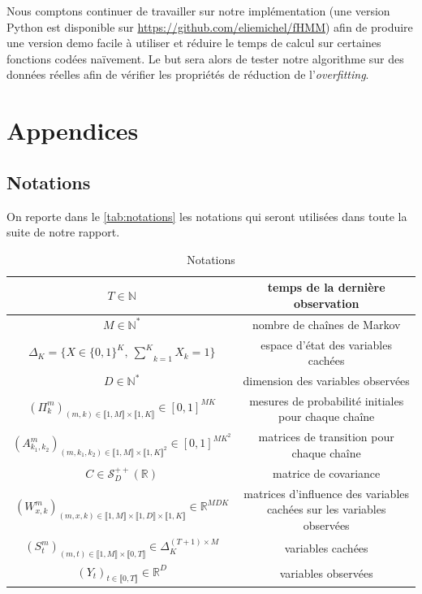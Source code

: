 \documentclass[10pt,a4paper]{article}
\begin{document}
Nous comptons continuer de travailler sur notre implémentation (une version Python est disponible sur \href{url}{https://github.com/eliemichel/fHMM}) afin de produire une version demo facile à utiliser et réduire le temps de calcul sur certaines fonctions codées naïvement. Le but sera alors de tester notre algorithme sur des données réelles afin de vérifier les propriétés de réduction de l'\textit{overfitting}.

\section{Appendices}
\subsection{Notations}
\label{Notations}
On reporte dans le \autoref{tab:notations} les notations qui seront utilisées
dans toute la suite de notre rapport.

\begin{table}[hpbt]

\begin{center}
  \begin{tabular}{|c|c|}
  \hline
  $T \in \mathbb{N}$ & temps de la dernière observation \\ \hline
  $M \in \mathbb{N}^*$ & nombre de chaînes de Markov \\ \hline
  $\Delta_K=\lbrace X \in \lbrace0,1\rbrace^K, \ 
  \underset{k=1}{\overset{K}{\sum}}X_k=1\rbrace$ & espace d'état des variables 
  cachées \\ \hline
  $D \in \mathbb{N}^*$ & dimension des variables observées \\ \hline
  $(\Pi_{k}^m)_{(m,k) \in \llbracket 1,M \rrbracket \times \llbracket 1,K 
  \rrbracket} \in [0,1]^{MK}$ & mesures de probabilité initiales pour chaque 
  chaîne \\ \hline
  $(A_{k_1,k_2}^m)_{(m,k_1,k_2) \in \llbracket 1,M \rrbracket \times \llbracket 
  1,K \rrbracket^2} \in [0,1]^{MK^2}$ & matrices de transition pour chaque chaîne 
   \\ \hline
  $C \in \mathcal{S}_D^{++}(\mathbb{R})$ & matrice de covariance \\ \hline
  $(W_{x,k}^m)_{(m,x,k) \in \llbracket 1,M \rrbracket \times \llbracket 1,D 
  \rrbracket \times \llbracket 1,K \rrbracket} \in \mathbb{R}^{MDK}$ & matrices 
  d'influence des variables cachées sur les variables observées \\ \hline
  $(S_t^m)_{(m,t) \in \llbracket 1,M \rrbracket \times \llbracket 0,T \rrbracket 
  } \in \Delta_K^{(T+1)\times M}$ & variables cachées \\ \hline
  $(Y_t)_{t \in \llbracket 0,T \rrbracket} \in \mathbb{R}^D$ & variables 
  observées \\ \hline
  \end{tabular}
  \caption{Notations\label{tab:notations}}
\end{center}
\end{table}
\end{document}
